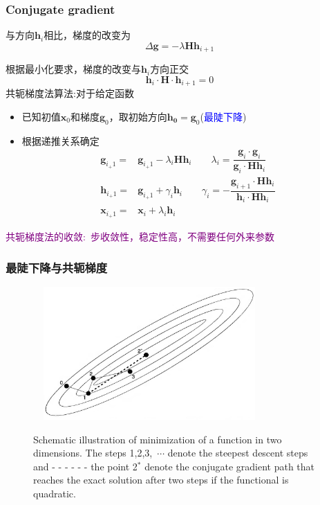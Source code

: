 \frame
{
	\frametitle{\textrm{Conjugate gradient}}
	与方向$\mathbf{h}_i$相比，梯度的改变为
	\begin{displaymath}
		\Delta\mathbf{g}=-\lambda\mathbf{H}\mathbf{h}_{i+1}
	\end{displaymath}

	根据最小化要求，梯度的改变与$\mathbf{h}_i$方向正交
	\begin{displaymath}
		\mathbf{h}_i\cdot\mathbf{H}\cdot\mathbf{h}_{i+1}=0
	\end{displaymath}
	共轭梯度法算法:对于给定函数
	\begin{itemize}
		\item 已知初值$\mathbf{x}_0$和梯度$\mathbf{g}_0$，取初始方向$\mathbf{h_0}=\mathbf{g}_0$(\textcolor{blue}{最陡下降})
		\item 根据递推关系确定
			\begin{displaymath}
				\begin{aligned}
					\mathbf{g}_{i_+1}=&\mathbf{g}_{i_+1}-\lambda_i\mathbf{H}\mathbf{h}_{i}\qquad \lambda_i=\dfrac{\mathbf{g}_i\cdot\mathbf{g}_i}{\mathbf{g}_i\cdot\mathbf{H}\mathbf{h}_i}\\	
					\mathbf{h}_{i_+1}=&\mathbf{g}_{i_+1}+\gamma_i\mathbf{h}_{i}\qquad \gamma_i=-\dfrac{\mathbf{g}_{i+1}\cdot\mathbf{H}\mathbf{h}_i}{\mathbf{h}_i\cdot\mathbf{H}\mathbf{h}_i}\\	
					\mathbf{x}_{i_+1}=&\mathbf{x}_{i}+\lambda_i\mathbf{h}_{i}
				\end{aligned}
			\end{displaymath}
	\end{itemize}
	\textcolor{purple}{共轭梯度法的收敛:~步收敛性，稳定性高，不需要任何外来参数}
}

\frame
{
	\frametitle{最陡下降与共轭梯度}
\begin{figure}[h!]
\centering
\includegraphics[height=2.0in,width=3.5in,viewport=0 0 950 590,clip]{Figures/OP_descent_CG.png}
\label{decent_CG}
\caption{\tiny \textrm{Schematic illustration of minimization of a function in two dimensions. The steps 1,2,3,~$\cdots$ denote the steepest descent steps and - \!- \!- \!- \!- \!- the point 2$^{\ast}$ denote the conjugate gradient path that reaches the exact solution after two steps if the functional is quadratic.}}%
\end{figure}
}

